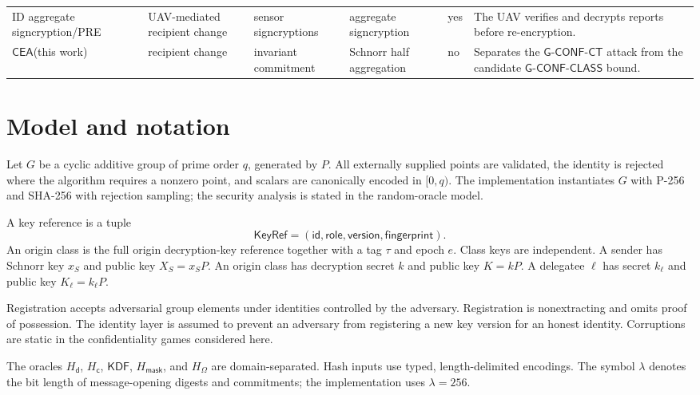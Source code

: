 \documentclass[11pt,letterpaper]{article}
\theoremstyle{definition}
\theoremstyle{remark}
\newcommand{\CEA}{\ensuremath{\mathsf{CEA}}\xspace}
\newcommand{\GClass}{\ensuremath{\mathsf{G\text{-}CONF\text{-}CLASS}}\xspace}
\newcommand{\GCT}{\ensuremath{\mathsf{G\text{-}CONF\text{-}CT}}\xspace}
\newcommand{\KeyRef}{\ensuremath{\mathsf{KeyRef}}}
\newcommand{\KDF}{\ensuremath{\mathsf{KDF}}}
\newcommand{\Hd}{\ensuremath{H_{\mathsf d}}}
\newcommand{\Hc}{\ensuremath{H_{\mathsf c}}}
\newcommand{\Hmask}{\ensuremath{H_{\mathsf{mask}}}}
\newcommand{\HOmega}{\ensuremath{H_{\Omega}}}
\begin{document}
\begin{table}[t]
\begin{tabularx}{\textwidth}{p{}p{}p{}p{}p{}Y}
ID aggregate signcryption/PRE~\cite{CJB26} & UAV-mediated recipient change & sensor signcryptions & aggregate signcryption & yes & The UAV verifies and decrypts reports before re-encryption. \\
\CEA (this work) & recipient change & invariant commitment & Schnorr half aggregation & no & Separates the \GCT attack from the candidate \GClass bound. \\
\bottomrule
\end{tabularx}
\end{table}

\section{Model and notation}
\label{sec:model}

Let \(G\) be a cyclic additive group of prime order \(q\), generated by \(P\).
All externally supplied points are validated, the identity is rejected where the
algorithm requires a nonzero point, and scalars are canonically encoded in
\([0,q)\).  The implementation instantiates \(G\) with P-256 and SHA-256 with
rejection sampling; the security analysis is stated in the random-oracle model.

A key reference is a tuple
\[
  \KeyRef=(\mathsf{id},\mathsf{role},\mathsf{version},\mathsf{fingerprint}).
\]
An origin class is the full origin decryption-key reference together with a tag
\(\tau\) and epoch \(e\).  Class keys are independent.  A sender has Schnorr key
\(x_S\) and public key \(X_S=x_SP\).  An origin class has decryption secret \(k\)
and public key \(K=kP\).  A delegatee \(\ell\) has secret \(k_\ell\) and public
key \(K_\ell=k_\ell P\).

Registration accepts adversarial group elements under identities controlled by
the adversary.  Registration is nonextracting and omits proof of possession.
The identity layer is assumed to prevent an adversary from registering a new key
version for an honest identity.  Corruptions are static in the confidentiality
games considered here.

The oracles \(\Hd\), \(\Hc\), \(\KDF\), \(\Hmask\), and \(\HOmega\) are
domain-separated.  Hash inputs use typed, length-delimited encodings.  The symbol
\(\lambda\) denotes the bit length of message-opening digests and commitments;
the implementation uses \(\lambda=256\).
\end{document}
